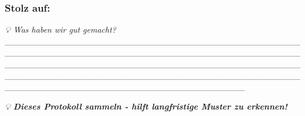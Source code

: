 \hypertarget{stolz-auf}{%
\subsubsection{\texorpdfstring{\textbf{Stolz auf:}}{Stolz auf:}}\label{stolz-auf}}

\emph{💡 Was haben wir gut gemacht?} \_\_\_\_\_\_\_\_\_\_\_\_\_\_\_\_\_\_\_\_\_\_\_\_\_\_\_\_\_\_\_\_\_\_\_\_\_\_\_\_\_\_\_\_\_\_\_\_\_\_\_\_\_\_\_\_\_\_\_\_\_\_\_\_\_\_\_\_\_\_\_\_\_\_\_\_\_\_\_\_\_\_\_\_\_\_\_\_\_\_\_\_\_\_\_\_\_\_\_\_\_\_\_\_\_\_\_\_\_\_\_\_\_\_\_\_\_\_\_\_\_\_\_\_\_\_\_\_\_\_\_\_\_\_\_\_\_\_\_\_\_\_\_\_\_\_\_\_\_\_\_\_\_\_\_\_\_\_\_\_\_\_\_\_\_\_\_\_\_\_\_\_\_\_\_\_\_\_\_\_\_\_\_\_\_\_\_\_\_\_\_\_\_\_\_\_\_\_\_\_\_\_\_\_\_\_\_\_\_\_\_\_\_\_\_\_\_\_\_\_\_\_\_\_\_\_\_\_\_\_\_

\emph{💡 \textbf{Dieses Protokoll sammeln - hilft langfristige Muster zu erkennen!}}


